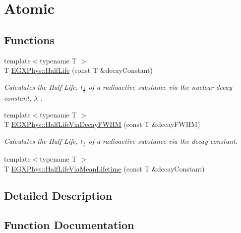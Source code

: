 \hypertarget{group___atomic}{}\section{Atomic}
\label{group___atomic}
\subsection*{Functions}
\begin{DoxyCompactItemize}
\item 
{\footnotesize template$<$typename T $>$ }\\T \hyperlink{group___atomic_ga21d268f154fb91c1c556bbfa7fe83ac1}{E\+G\+X\+Phys\+::\+Half\+Life} (const T \&decay\+Constant)
\begin{DoxyCompactList}\small\item\em Calculates the Half Life, $t_{\frac{1}{2}}$ of a radioactive substance via the nuclear decay constant, $\lambda$ . \end{DoxyCompactList}\item 
{\footnotesize template$<$typename T $>$ }\\T \hyperlink{group___atomic_ga705a1fd3584a6d196676743024053fb8}{E\+G\+X\+Phys\+::\+Half\+Life\+Via\+Decay\+F\+W\+HM} (const T \&decay\+F\+W\+HM)
\begin{DoxyCompactList}\small\item\em Calculates the Half Life, $t_{\frac{1}{2}}$ of a radioactive substance via the decay constant. \end{DoxyCompactList}\item 
{\footnotesize template$<$typename T $>$ }\\T \hyperlink{group___atomic_gae2cb33d92f1422b9ccf453f18553d318}{E\+G\+X\+Phys\+::\+Half\+Life\+Via\+Mean\+Lifetime} (const T \&decay\+Constant)
\end{DoxyCompactItemize}


\subsection{Detailed Description}


\subsection{Function Documentation}
\mbox{\label{group___atomic_ga21d268f154fb91c1c556bbfa7fe83ac1}} 

